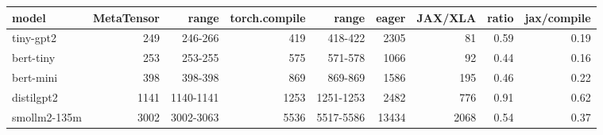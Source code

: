 \begin{tabular}{lrrrrrrrr}
\toprule
model & MetaTensor & range & torch.compile & range & eager & JAX/XLA & ratio & jax/compile \\
\midrule
tiny-gpt2 & 249 & 246-266 & 419 & 418-422 & 2305 & 81 & 0.59 & 0.19 \\
bert-tiny & 253 & 253-255 & 575 & 571-578 & 1066 & 92 & 0.44 & 0.16 \\
bert-mini & 398 & 398-398 & 869 & 869-869 & 1586 & 195 & 0.46 & 0.22 \\
distilgpt2 & 1141 & 1140-1141 & 1253 & 1251-1253 & 2482 & 776 & 0.91 & 0.62 \\
smollm2-135m & 3002 & 3002-3063 & 5536 & 5517-5586 & 13434 & 2068 & 0.54 & 0.37 \\
\bottomrule
\end{tabular}

